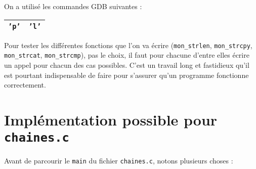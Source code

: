 \documentclass[10pt]{article}
\begin{document}
\begin{enumerate}[label=\textbf{[\alph*]}]
  \setlength\itemsep{1em}

\item On a utilisé les commandes GDB suivantes :

  \begin{center}
    \begin{tabular}{|c|c|}
      \hline
      \texttt{'p'} & \texttt{'l'} & \\
      \hline
    \end{tabular}
  \end{center}

\item Pour tester les différentes fonctions que l'on va écrire
  (\texttt{mon\_strlen}, \texttt{mon\_strcpy}, \texttt{mon\_strcat},
  \texttt{mon\_strcmp}), pas le choix, il faut pour chacune d'entre
  elles écrire un appel pour chacun des cas possibles. C'est un travail
  long et fastidieux qu'il est pourtant indispensable de faire pour
  s'assurer qu'un programme fonctionne correctement.

\end{enumerate}

\newpage

\section{Implémentation possible pour \texttt{chaines.c}}



\vspace{0.5cm}

Avant de parcourir le \texttt{main} du fichier \texttt{chaines.c},
notons plusieurs choses :
\end{document}
